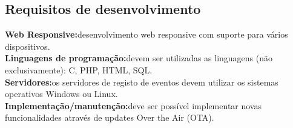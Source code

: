 \subsection{Requisitos de desenvolvimento}
\textbf{Web Responsive:}desenvolvimento web responsive com suporte para vários dispositivos.
\\
\textbf{Linguagens de programação:}devem ser utilizadas as linguagens (não exclusivamente): C, PHP, HTML, SQL.
\\
\textbf{Servidores:}os servidores de registo de eventos devem utilizar os sistemas operativos Windows ou Linux.
\\
\textbf{Implementação/manutenção:}deve ser possível implementar novas funcionalidades através de updates Over the Air (OTA).
